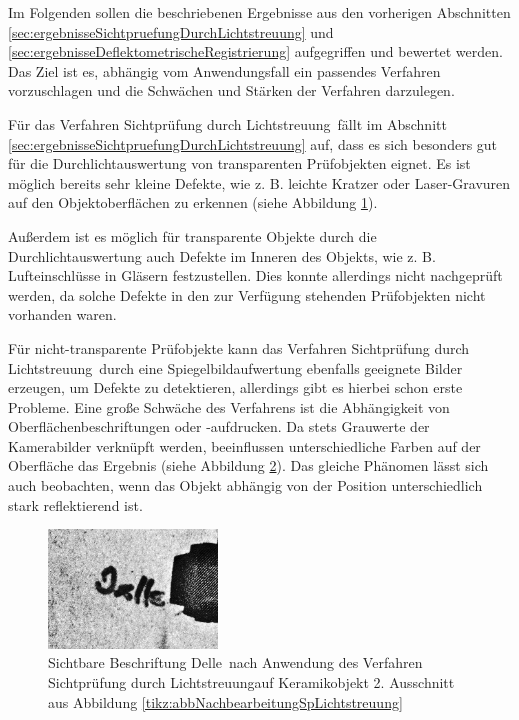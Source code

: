 Im Folgenden sollen die beschriebenen Ergebnisse aus den vorherigen Abschnitten \ref{sec:ergebnisseSichtpruefungDurchLichtstreuung} und \ref{sec:ergebnisseDeflektometrischeRegistrierung} aufgegriffen und bewertet werden.
Das Ziel ist es, abhängig vom Anwendungsfall ein passendes Verfahren vorzuschlagen und die Schwächen und Stärken der Verfahren darzulegen.

\p
Für das Verfahren \glqq Sichtprüfung durch Lichtstreuung\grqq ~fällt im Abschnitt \ref{sec:ergebnisseSichtpruefungDurchLichtstreuung} auf, dass es sich besonders gut für die Durchlichtauswertung von transparenten Prüfobjekten eignet.
Es ist möglich bereits sehr kleine Defekte, wie z. B. leichte Kratzer oder Laser-Gravuren auf den Objektoberflächen zu erkennen (siehe Abbildung \ref{tikz:abbErkennbareKleineDefekteLichtstreuung}).

{
	\begin{figure}[H]
		\centering
		
		\label{tikz:abbErkennbareKleineDefekteLichtstreuung}
	\end{figure}
}

\noindent
Außerdem ist es möglich für transparente Objekte durch die Durchlichtauswertung auch Defekte im Inneren des Objekts, wie z. B. Lufteinschlüsse in Gläsern festzustellen.
Dies konnte allerdings nicht nachgeprüft werden, da solche Defekte in den zur Verfügung stehenden Prüfobjekten nicht vorhanden waren.

\p
Für nicht-transparente Prüfobjekte kann das Verfahren \glqq Sichtprüfung durch Lichtstreuung\grqq ~durch eine Spiegelbildaufwertung ebenfalls geeignete Bilder erzeugen, um Defekte zu detektieren, allerdings gibt es hierbei schon erste Probleme.
Eine große Schwäche des Verfahrens ist die Abhängigkeit von Oberflächenbeschriftungen oder -aufdrucken.
Da stets Grauwerte der Kamerabilder verknüpft werden, beeinflussen unterschiedliche Farben auf der Oberfläche das Ergebnis (siehe Abbildung \ref{img:delleBeschriftung}).
Das gleiche Phänomen lässt sich auch beobachten, wenn das Objekt abhängig von der Position unterschiedlich stark reflektierend ist.

{
	\begin{figure}[H]
		\centering
		\includegraphics[width=0.4\textwidth]{05_ergebnisse/ergDiskussion/figures/delleBeschriftung}
		\caption[Sichtbare Beschriftung nach Anwendung des Verfahrens aus Kapitel \ref{chp:sichtpruefungDurchLichtstreuung}]{Sichtbare Beschriftung \glqq Delle\grqq ~nach Anwendung des Verfahren \glqq Sichtprüfung durch Lichtstreuung\grqq auf Keramikobjekt 2. Ausschnitt aus Abbildung \ref{tikz:abbNachbearbeitungSpLichtstreuung}}
		\label{img:delleBeschriftung}
	\end{figure}
}

